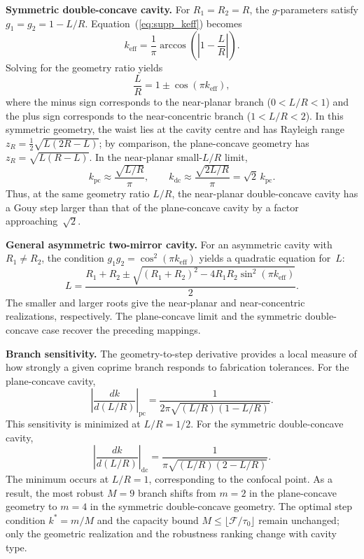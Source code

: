 \documentclass{optica-article}%
\begin{document}
\medskip\noindent\textbf{Symmetric double-concave cavity.}\quad
For $R_1=R_2=R$, the $g$-parameters satisfy $g_1=g_2=1-L/R$. Equation~(\ref{eq:supp_keff}) becomes
\begin{equation}
k_{\mathrm{eff}} = \frac{1}{\pi}\arccos\!\left(\left|1-\frac{L}{R}\right|\right).
\label{eq:supp_keff_dc}
\end{equation}
Solving for the geometry ratio yields
\begin{equation}
\frac{L}{R} = 1 \pm \cos(\pi k_{\mathrm{eff}}),
\label{eq:supp_dc_inverse}
\end{equation}
where the minus sign corresponds to the near-planar branch ($0<L/R<1$) and the plus sign corresponds to the near-concentric branch ($1<L/R<2$). In this symmetric geometry, the waist lies at the cavity centre and has Rayleigh range $z_R=\frac{1}{2}\sqrt{L(2R-L)}$; by comparison, the plane-concave geometry has $z_R=\sqrt{L(R-L)}$. In the near-planar small-$L/R$ limit,
\begin{equation}
k_{\mathrm{pc}} \approx \frac{\sqrt{L/R}}{\pi}, \qquad k_{\mathrm{dc}} \approx \frac{\sqrt{2L/R}}{\pi} = \sqrt{2}\,k_{\mathrm{pc}}.
\label{eq:supp_small_rho}
\end{equation}
Thus, at the same geometry ratio $L/R$, the near-planar double-concave cavity has a Gouy step larger than that of the plane-concave cavity by a factor approaching~$\sqrt{2}$.

\medskip\noindent\textbf{General asymmetric two-mirror cavity.}\quad
For an asymmetric cavity with $R_1\neq R_2$, the condition $g_1 g_2=\cos^2(\pi k_{\mathrm{eff}})$ yields a quadratic equation for~$L$:
\begin{equation}
L = \frac{R_1+R_2 \pm \sqrt{(R_1+R_2)^2 - 4R_1 R_2 \sin^2(\pi k_{\mathrm{eff}})}}{2}.
\label{eq:supp_general_inverse}
\end{equation}
The smaller and larger roots give the near-planar and near-concentric realizations, respectively. The plane-concave limit and the symmetric double-concave case recover the preceding mappings.

\medskip\noindent\textbf{Branch sensitivity.}\quad
The geometry-to-step derivative provides a local measure of how strongly a given coprime branch responds to fabrication tolerances. For the plane-concave cavity,
\begin{equation}
\left|\frac{dk}{d(L/R)}\right|_{\mathrm{pc}} = \frac{1}{2\pi\sqrt{(L/R)(1-L/R)}}.
\label{eq:supp_sensitivity_pc}
\end{equation}
This sensitivity is minimized at $L/R=1/2$. For the symmetric double-concave cavity,
\begin{equation}
\left|\frac{dk}{d(L/R)}\right|_{\mathrm{dc}} = \frac{1}{\pi\sqrt{(L/R)(2-L/R)}}.
\label{eq:supp_sensitivity_dc}
\end{equation}
The minimum occurs at $L/R=1$, corresponding to the confocal point. As a result, the most robust $M=9$ branch shifts from $m=2$ in the plane-concave geometry to $m=4$ in the symmetric double-concave geometry. The optimal step condition $k^*=m/M$ and the capacity bound $M\le\lfloor\mathcal{F}/\tau_0\rfloor$ remain unchanged; only the geometric realization and the robustness ranking change with cavity type.


\end{document}
